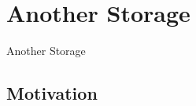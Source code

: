 \documentclass[aspectratio=169]{beamer}
\begin{document}
\section{Another Storage}

{
\begin{frame}{Another Storage}
\end{frame}
}

\subsection{Motivation}
\end{document}
